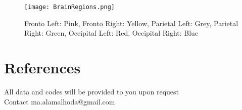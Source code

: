 \documentclass[9pt,twocolumn]{paper-template}
\begin{document}
\begin{figure}[h!]
	\centering
	\texttt{[image: BrainRegions.png]}
 	\caption{Fronto Left: Pink, Fronto Right: Yellow, Parietal Left: Grey, Parietal Right: Green, Occipital Left: Red, Occipital Right: Blue}
  	\label{fig:BrainRegions}
\end{figure}

\newpage


\showacknow{} %

\section*{References}


\bigskip
\begin{center}
All data and codes will be provided to you upon request\\
\smallskip
Contact ma.alamalhoda@gmail.com
\end{center}
\end{document}
